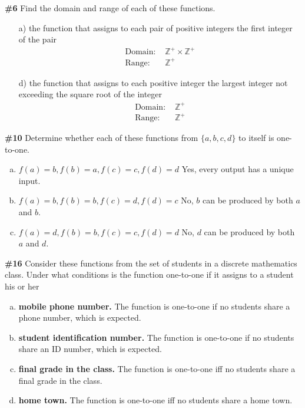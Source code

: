\documentclass{article}
\newcommand{\problem}[1]{\textbf{\##1}}
\newcommand{\prob}[1]{\problem{#1}}
\newcommand{\AllIntegers}{\mathbb{Z}}
\begin{document}
\pagebreak
\prob{6}
Find the domain and range of each of these functions.

\begin{enumerate}
    \item [a)] the function that assigns to each pair of positive integers the first integer of the pair
    \begin{align*}
        \text{Domain: } &\AllIntegers^{+} \times \AllIntegers^{+}\\
        \text{Range: } &\AllIntegers^{+}
    \end{align*}
    \item [d)] the function that assigns to each positive integer the
    largest integer not exceeding the square root of the integer
    \begin{align*}
        \text{Domain: } &\AllIntegers^{+}\\
        \text{Range: } &\AllIntegers^{+}
    \end{align*}
\end{enumerate}

\pagebreak
\prob{10}
Determine whether each of these functions from
\(\{a, b, c, d\}\) to itself is one-to-one.

\begin{enumerate}[a)]
    \item \(f(a)=b, f(b)=a, f(c)=c,f(d)=d\) Yes, every output has a unique input.
    \item \(f(a) = b, f(b) = b, f(c) = d, f(d) = c\) No, \(b\) can be produced by both \(a\) and \(b\).
    \item \(f(a) = d, f(b) = b, f(c) = c, f(d) = d\) No, \(d\) can be produced by both \(a\) and \(d\).
\end{enumerate}

\pagebreak
\prob{16}
Consider these functions from the set of students in a discrete mathematics class. Under what conditions is the function one-to-one if it assigns to a student his or her

\begin{enumerate}[a)]
    \item \textbf{mobile phone number.}
    The function is one-to-one if no students share a phone number, which is expected.
    \item \textbf{student identification number.}
    The function is one-to-one if no students share an ID number, which is expected.
    \item \textbf{final grade in the class.}
    The function is one-to-one iff no students share a final grade in the class. 
    \item \textbf{home town.}
    The function is one-to-one iff no students share a home town.
\end{enumerate}
\end{document}
